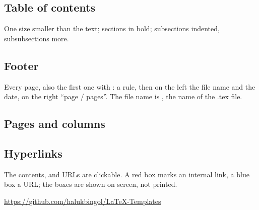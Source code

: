 \documentclass[11pt]{amsart}         %
\begin{document}
\subsection{Table of contents}

One size smaller than the text; sections in bold; subsections indented, subsubsections more.

\begin{texcode}
\setcounter{tocdepth}{2}   %
\end{texcode}


\subsection{Footer}

Every page, also the first one with :
a rule, then on the left the file name and the date, on the right ``page / pages''.
The file name is , the name of the .tex file.


\subsection{Pages and columns}



\subsection{Hyperlinks}

The contents,  and URLs are clickable.
A red box marks an internal link, a blue box a URL; the boxes are shown on screen, not printed.

\url{https://github.com/halukbingol/LaTeX-Templates}

\begin{texcode}
\hypersetup{hidelinks}                       %
\hypersetup{colorlinks=true, linkcolor=blue!70!black, urlcolor=blue, citecolor=green!50!black}
\end{texcode}
\end{document}
